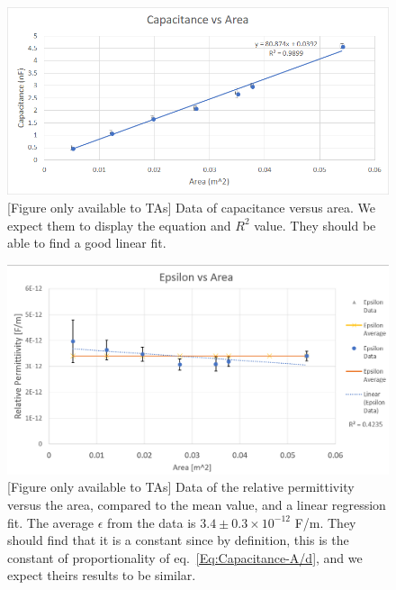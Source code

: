\documentclass[12pt]{report}
\begin{document}
\begin{figure}[h]
\includegraphics[width=\textwidth]{lab1-results-area}
\caption{[Figure only available to TAs] Data of capacitance versus area. We expect them to display the equation and $R^2$ value. They should be able to find a good linear fit.}
\label{Fig:Lab1-results-area}
\end{figure}
\begin{figure}[h]
\includegraphics[width=\textwidth]{lab1-results-area2}
\caption{[Figure only available to TAs] Data of the relative permittivity versus the area, compared to the mean value, and a  linear regression fit. The average $\epsilon$ from the data is $3.4 \pm 0.3 \times 10^{-12}$ F/m.
They should find that it is a constant since by definition, this is the constant of proportionality of eq.~\eqref{Eq:Capacitance-A/d}, and we expect theirs results to be similar.}
\label{Fig:Lab1-results-area2}
\end{figure}
\end{document}
